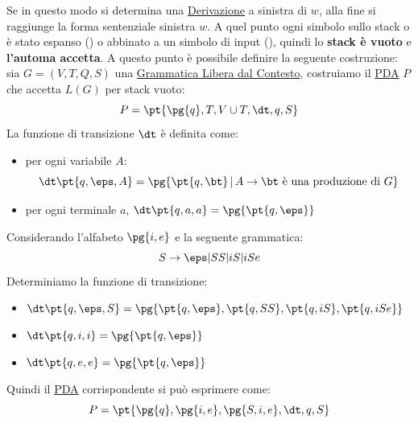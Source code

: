 Se in questo modo si determina una \hyperref[rem:gram-derivazione]{Derivazione} a sinistra di $w$, alla fine si raggiunge la forma sentenziale sinistra $w$.
A quel punto ogni simbolo sullo stack o è stato espanso () o abbinato a un simbolo di input (), quindi lo \textbf{stack è vuoto} e \textbf{l'automa accetta}.  
\emptyln{}
A questo punto è possibile definire la seguente costruzione: sia $G = (V,T,Q,S)$ una \hyperref[def:cfg]{Grammatica Libera dal Contesto}, costruiamo il \hyperref[def:pda]{PDA} $P$ che accetta $L(G)$ per stack vuoto:
\[
    P = \pt{\pg{q},T,V\cup T,\dt,q,S}
\]
La funzione di transizione $\dt$ è definita come:
\begin{itemize}
    \item per ogni variabile $A$:
        \[
            \dt \pt{q,\eps,A} = \pg{\pt{q,\bt}\,|\, A\to\bt\text{ è una produzione di }G}
        \]
    \item per ogni terminale $a$, $\dt \pt{q,a,a} = \pg{\pt{q,\eps}}$
\end{itemize}
\begin{example}{}{}
    Considerando l'alfabeto $\pg{i,e}$ e la seguente grammatica:
    \[
        S \to\eps|SS|iS|iSe
    \]
    Determiniamo la funzione di transizione:
    \begin{itemize}
        \item $\dt \pt{q,\eps,S} = \pg{\pt{q,\eps}, \pt{q,SS}, \pt{q,iS}, \pt{q,iSe}}$
        \item $\dt \pt{q,i,i} = \pg{\pt{q,\eps}}$
        \item $\dt \pt{q,e,e} = \pg{\pt{q,\eps}}$
    \end{itemize}
    Quindi il \hyperref[def:pda]{PDA} corrispondente si può esprimere come:
    \[
        P = \pt{\pg{q}, \pg{i,e}, \pg{S,i,e}, \dt, q, S}
    \]
    \begin{flushright}
        \qedsymbol
    \end{flushright}
\end{example}
%

